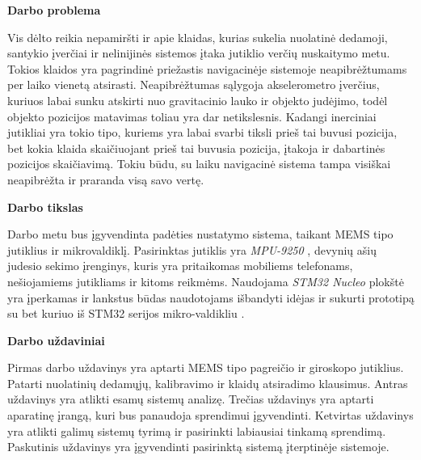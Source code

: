 \textbf{Darbo problema}

Vis dėlto reikia nepamiršti ir apie klaidas, kurias sukelia nuolatinė dedamoji, santykio įverčiai ir nelinijinės sistemos įtaka jutiklio verčių nuskaitymo metu.
Tokios klaidos yra pagrindinė priežastis navigacinėje sistemoje neapibrėžtumams per laiko vienetą atsirasti. 
Neapibrėžtumas sąlygoja akselerometro įverčius, kuriuos labai sunku atskirti nuo gravitacinio lauko ir objekto judėjimo, todėl objekto pozicijos matavimas toliau yra dar netikslesnis. 
Kadangi inerciniai jutikliai yra tokio tipo, kuriems yra labai svarbi tiksli prieš tai buvusi pozicija, bet kokia klaida skaičiuojant prieš tai buvusia pozicija, įtakoja ir dabartinės pozicijos skaičiavimą. 
Tokiu būdu, su laiku navigacinė sistema tampa visiškai neapibrėžta ir praranda visą savo vertę.

\textbf{Darbo tikslas}

Darbo metu bus įgyvendinta padėties nustatymo sistema, taikant MEMS tipo jutiklius ir mikrovaldiklį.
Pasirinktas jutiklis yra \textit{MPU-9250} \cite{MPU-96:online}, devynių ašių judesio sekimo įrenginys, kuris yra pritaikomas mobiliems telefonams, nešiojamiems jutikliams ir kitoms reikmėms.
Naudojama \textit{STM32 Nucleo} plokštė yra įperkamas ir lankstus būdas naudotojams išbandyti idėjas ir sukurti prototipą su bet kuriuo iš STM32 serijos mikro-valdikliu \cite{STM3258:online}.

\textbf{Darbo uždaviniai}

Pirmas darbo uždavinys yra aptarti MEMS tipo pagreičio ir giroskopo jutiklius.
Patarti nuolatinių dedamųjų, kalibravimo ir klaidų atsiradimo klausimus.
Antras uždavinys yra atlikti esamų sistemų analizę.
Trečias uždavinys yra aptarti aparatinę įrangą, kuri bus panaudoja sprendimui įgyvendinti.
Ketvirtas uždavinys yra atlikti galimų sistemų tyrimą ir pasirinkti labiausiai tinkamą sprendimą.
Paskutinis uždavinys yra įgyvendinti pasirinktą sistemą įterptinėje sistemoje.